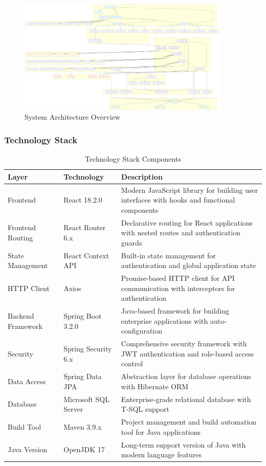 \documentclass[12pt,a4paper]{article}
\begin{document}
\begin{figure}[H]
\centering
\includegraphics[width=0.9\textwidth]{diagrams/system_architecture.svg}
\caption{System Architecture Overview}
\label{fig:system-architecture}
\end{figure}

\subsubsection{Technology Stack}

\begin{table}[H]
\centering
\caption{Technology Stack Components}
\label{tab:tech-stack}
\begin{tabularx}{\textwidth}{|l|l|X|}
\hline
\textbf{Layer} & \textbf{Technology} & \textbf{Description} \\
\hline
Frontend & React 18.2.0 & Modern JavaScript library for building user interfaces with hooks and functional components \\
\hline
Frontend Routing & React Router 6.x & Declarative routing for React applications with nested routes and authentication guards \\
\hline
State Management & React Context API & Built-in state management for authentication and global application state \\
\hline
HTTP Client & Axios & Promise-based HTTP client for API communication with interceptors for authentication \\
\hline
Backend Framework & Spring Boot 3.2.0 & Java-based framework for building enterprise applications with auto-configuration \\
\hline
Security & Spring Security 6.x & Comprehensive security framework with JWT authentication and role-based access control \\
\hline
Data Access & Spring Data JPA & Abstraction layer for database operations with Hibernate ORM \\
\hline
Database & Microsoft SQL Server & Enterprise-grade relational database with T-SQL support \\
\hline
Build Tool & Maven 3.9.x & Project management and build automation tool for Java applications \\
\hline
Java Version & OpenJDK 17 & Long-term support version of Java with modern language features \\
\hline
\end{tabularx}
\end{table}
\end{document}
